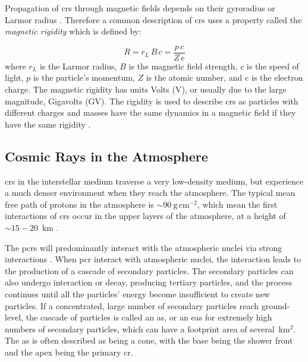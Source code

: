 Propagation of \glspl{cr} through magnetic fields depends on their gyroradius or Larmor radius \citep{particle_data_group_review_2020}. Therefore a common description of \glspl{cr} uses a property called the {\textit{magnetic rigidity}} which is defined by:

\begin{equation}
\label{eq:rigidity}
R = r_L \, B \, c = \frac{p \, c}{Z \, e}
\end{equation}
%
where $r_L$ is the Larmor radius, $B$ is the magnetic field strength, $c$ is the speed of light, $p$ is the particle's momentum, $Z$ is the atomic number, and $e$ is the electron charge. The magnetic rigidity has units Volts (V), or usually due to the large magnitude, Gigavolts (GV). The rigidity is used to describe \glspl{cr} as particles with different charges and masses have the same dynamics in a magnetic field if they have the same rigidity \citep{particle_data_group_review_2020}.



\subsection{Cosmic Rays in the Atmosphere}
\label{sec:air_shower}

\glspl{cr} in the interstellar medium traverse a very low-density medium, but experience a much denser environment when they reach the atmosphere. The typical mean free path of protons in the atmosphere is $\sim90~\mathrm{g}\,\mathrm{cm}^{-2}$, which mean the first interactions of \glspl{cr} occur in the upper layers of the atmosphere, at a height of $\sim15-20$~km \citep{grupen_astroparticle_2005}. %

The \glspl{pcr} will predominantly interact with the atmospheric nuclei via strong interactions \citep{grupen_astroparticle_2005}. When \gls{pcr} interact with atmospheric nuclei, the interaction leads to the production of a cascade of secondary particles. The secondary particles can also undergo interaction or decay, producing tertiary particles, and the process continues until all the particles' energy become insufficient to create new particles. If a concentrated, large number of secondary particles reach ground-level, the cascade of particles is called an \gls{as}, or an \gls{eas} for extremely high numbers of secondary particles, which can have a footprint area of several~km$^2$. The \gls{as} is often described as being a cone, with the base being the shower front and the apex being the primary \gls{cr}.

